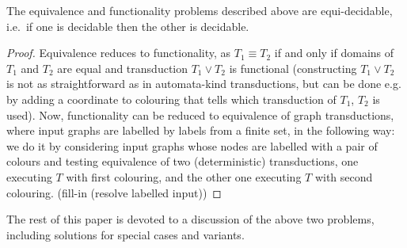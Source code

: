 \begin{fact}\label{fact:equi-decidable}
    The equivalence and functionality problems described above are equi-decidable, i.e.~if one is decidable then the other is decidable. 
\end{fact}
\begin{proof}
    Equivalence reduces to functionality, as $T_1\equiv T_2$ if and only if domains of $T_1$ and $T_2$ are equal and transduction $T_1 \vee T_2$ is functional (constructing $T_1 \vee T_2$ is not as straightforward as in automata-kind transductions, but can be done e.g. by adding a coordinate to colouring that tells which transduction of $T_1$, $T_2$ is used). Now, functionality can be reduced to equivalence of graph transductions, where input graphs are labelled by labels from a finite set, in the following way: we do it by considering input graphs whose nodes are labelled with a pair of colours and testing equivalence of two (deterministic) transductions, one executing $T$ with first colouring, and the other one executing $T$ with second colouring. (fill-in (resolve labelled input))
\end{proof}

The rest of this paper is devoted to a discussion of the above two problems, including solutions for special cases and variants.